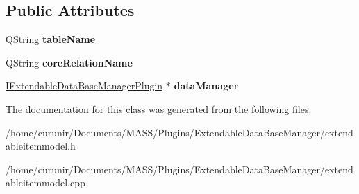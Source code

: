 \subsection*{Public Attributes}
\begin{DoxyCompactItemize}
\item 
Q\+String {\bfseries table\+Name}\hypertarget{class_extendable_item_model_a41d1ee82e5e9d049fc59a672a5a1bcac}{}\label{class_extendable_item_model_a41d1ee82e5e9d049fc59a672a5a1bcac}

\item 
Q\+String {\bfseries core\+Relation\+Name}\hypertarget{class_extendable_item_model_a05024d7077bdcd12ce918a8e01ec11e9}{}\label{class_extendable_item_model_a05024d7077bdcd12ce918a8e01ec11e9}

\item 
\hyperlink{class_i_extendable_data_base_manager_plugin}{I\+Extendable\+Data\+Base\+Manager\+Plugin} $\ast$ {\bfseries data\+Manager}\hypertarget{class_extendable_item_model_a124bbba7be0bd4fd344f8db064c734e6}{}\label{class_extendable_item_model_a124bbba7be0bd4fd344f8db064c734e6}

\end{DoxyCompactItemize}


The documentation for this class was generated from the following files\+:\begin{DoxyCompactItemize}
\item 
/home/curunir/\+Documents/\+M\+A\+S\+S/\+Plugins/\+Extendable\+Data\+Base\+Manager/extendableitemmodel.\+h\item 
/home/curunir/\+Documents/\+M\+A\+S\+S/\+Plugins/\+Extendable\+Data\+Base\+Manager/extendableitemmodel.\+cpp\end{DoxyCompactItemize}
